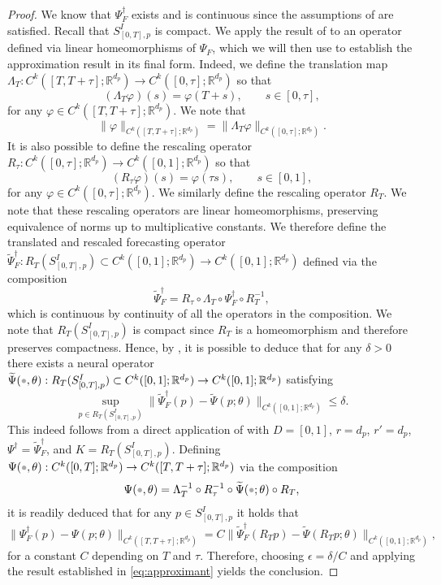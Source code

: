 \documentclass[10pt,a4paper]{amsart}
\newcommand{\R}{\mathbbm{R}}
\providecommand{\mathbbm}{\mathbb} %
\newcommand{\placeholder}{\mathord{\color{black!33}\bullet}}
\begin{document}
\begin{proof}
    We know that $\Psi_F^{\dagger}$ exists and is continuous since the assumptions of  are satisfied. Recall that $S^I_{[0,T],p}$ is compact. We apply the result of  to an operator defined via linear homeomorphisms of $\Psi_F$, which we will then use to establish the approximation result in its final form. Indeed, we define the translation map $\Lambda_T:C^k([T,T+\tau];\R^{d_p})\to C^k([0,\tau];\R^{d_p})$ so that
    \[(\Lambda_T \varphi)(s) = \varphi(T+s), \qquad s\in[0,\tau], \]
    for any $\varphi\in C^k([T,T+\tau];\R^{d_p})$. We note that 
    \[\|\varphi\|_{C^k([T,T+\tau];\R^{d_p})} = \|\Lambda_T\varphi\|_{C^k([0,\tau];\R^{d_p})}.\]
    It is also possible to define the rescaling operator $R_\tau:C^k([0,\tau];\R^{d_p})\to C^k([0,1];\R^{d_p})$ so that
    \[
    (R_\tau\varphi)(s) = \varphi(\tau s), \qquad s\in[0,1],
    \]
    for any $\varphi\in C^k([0,\tau];\R^{d_p})$. We similarly define the rescaling operator $R_T$. We note that these rescaling operators are linear homeomorphisms, preserving equivalence of norms up to multiplicative constants. We therefore define the translated and rescaled forecasting operator $\widetilde{\Psi}^\dagger_F:R_T(S^I_{[0,T],p})\subset C^k([0,1];\R^{d_p})\to C^k([0,1];\R^{d_p})$ defined via the composition
    \[
    \widetilde{\Psi}^\dagger_F = R_\tau \circ \Lambda_T \circ {\Psi}^\dagger_F \circ R_T^{-1},
    \]
    which is continuous by continuity of all the operators in the composition. We note that $R_T(S^I_{[0,T],p})$ is compact since $R_T$ is a homeomorphism and therefore preserves compactness. Hence, by , it is possible to deduce that for any $\delta>0$ there exists a neural operator $\widetilde{\Psi}(\placeholder,\theta): R_T(S^I_{[0,T],p})\subset C^k([0,1];\R^{d_p})\to C^k([0,1];\R^{d_p})$ satisfying
    \begin{equation}
    \label{eq:approximant}
    \sup_{p \in R_T(S^I_{[0,T],p})} \|\widetilde{\Psi}_F^\dagger(p) - \widetilde{\Psi}(p;\theta)\|_{C^k([0,1];\R^{d_p})} \leq \delta. 
    \end{equation}
    This indeed follows from a direct application of  with $D = [0, 1]$, $r = d_p$, $r' = d_p$, $\Psi^{\dagger} = \widetilde{\Psi}_F^{\dagger}$, and $K = R_T(S^I_{[0,T],p})$. Defining $\Psi(\placeholder,\theta):C^k ([0,T];\R^{d_p}) \to C^k ([T,T+\tau];\R^{d_p})$ via the composition
    \[
    \Psi(\placeholder,\theta) = \Lambda_T^{-1}\circ R_\tau^{-1} \circ \widetilde{\Psi}(\placeholder;\theta)\circ R_T,
    \]
    it is readily deduced that for any $p \in S^I_{[0,T],p}$ it holds that
    \[
    \|\Psi_F^\dagger(p) - \Psi(p;\theta)\|_{C^k([T,T+\tau];\R^{d_p})} = C\|\widetilde{\Psi}_F^\dagger(R_Tp) - \widetilde{\Psi}(R_Tp;\theta)\|_{C^k([0,1];\R^{d_p})},
    \]
    for a constant $C$ depending on $T$ and $\tau$. Therefore, choosing $\epsilon=\delta/C$ and applying the result established in \eqref{eq:approximant} yields the conclusion.
    \end{proof}
\end{document}
